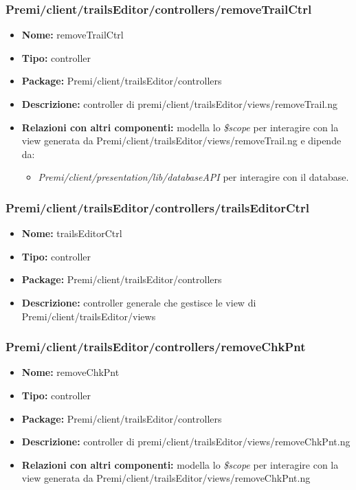 \subsubsection{Premi/client/trailsEditor/controllers/removeTrailCtrl}
\begin{itemize}
  \item[] \textbf{Nome:} removeTrailCtrl
  \item[] \textbf{Tipo:} controller
  \item[] \textbf{Package:} Premi/client/trailsEditor/controllers
  \item[] \textbf{Descrizione:} controller di premi/client/trailsEditor/views/removeTrail.ng
  \item[] \textbf{Relazioni con altri componenti:} modella lo \textit{\$scope} per interagire con la view generata da Premi/client/trailsEditor/views/removeTrail.ng e dipende da:
  \begin{itemize}
  	\item \textit{Premi/client/presentation/lib/databaseAPI} per interagire con il database.
  \end{itemize}
\end{itemize}
\subsubsection{Premi/client/trailsEditor/controllers/trailsEditorCtrl}
\begin{itemize}
  \item[] \textbf{Nome:} trailsEditorCtrl
  \item[] \textbf{Tipo:} controller
  \item[] \textbf{Package:} Premi/client/trailsEditor/controllers
  \item[] \textbf{Descrizione:} controller generale che gestisce le view di Premi/client/trailsEditor/views
\end{itemize}
\subsubsection{Premi/client/trailsEditor/controllers/removeChkPnt}
\begin{itemize}
  \item[] \textbf{Nome:} removeChkPnt
  \item[] \textbf{Tipo:} controller
  \item[] \textbf{Package:} Premi/client/trailsEditor/controllers
  \item[] \textbf{Descrizione:} controller di premi/client/trailsEditor/views/removeChkPnt.ng
  \item[] \textbf{Relazioni con altri componenti:} modella lo \textit{\$scope} per interagire con la view generata da Premi/client/trailsEditor/views/removeChkPnt.ng
\end{itemize}

